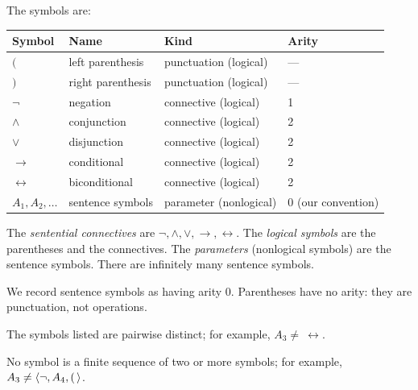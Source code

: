 \documentclass[11pt]{article}
\begin{document}
\begin{definition}\label{def:symbols-sentential}
The symbols are:
\begin{center}
\begin{tabular}{llll}
\toprule
Symbol & Name & Kind & Arity \\
\midrule
$($ & left parenthesis & punctuation (logical) & --- \\
$)$ & right parenthesis & punctuation (logical) & --- \\
$\neg$ & negation & connective (logical) & 1 \\
$\land$ & conjunction & connective (logical) & 2 \\
$\lor$ & disjunction & connective (logical) & 2 \\
$\to$ & conditional & connective (logical) & 2 \\
$\leftrightarrow$ & biconditional & connective (logical) & 2 \\
$A_1, A_2, \dots$ & sentence symbols & parameter (nonlogical) & 0 (our convention) \\
\bottomrule
\end{tabular}
\end{center}
The \emph{sentential connectives} are $\neg,\land,\lor,\to,\leftrightarrow$.
The \emph{logical symbols} are the parentheses and the connectives.
The \emph{parameters} (nonlogical symbols) are the sentence symbols. There are
infinitely many sentence symbols.
\end{definition}

\begin{quantified}
\end{quantified}

\begin{convention}
We record sentence symbols as having arity $0$. Parentheses have no arity:
they are punctuation, not operations.
\end{convention}

\begin{assumption}[Distinctness]\label{asm:symbols-distinct}
The symbols listed are pairwise distinct; for example, $A_3 \neq\ \leftrightarrow$.
\end{assumption}

\begin{assumption}\label{asm:no-symbol-is-sequence}
No symbol is a finite sequence of two or more symbols; for example,
$A_3 \neq \langle \neg, A_4, (\,\rangle$.
\end{assumption}
\end{document}
